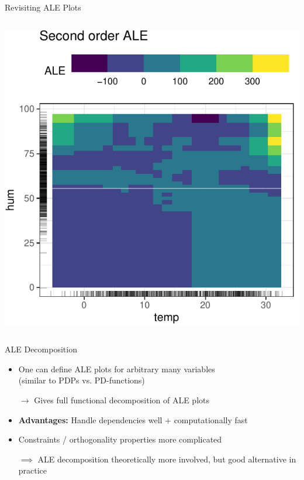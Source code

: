 \documentclass[10pt,compress,t,notes=noshow, xcolor=table]{beamer}
\begin{document}
\begin{frame}{Revisiting ALE Plots}
\begin{columns}[c, totalwidth=\linewidth]
\begin{column}{0.5\textwidth}
        \includegraphics{figure/ale2d}
    \end{column}
    \end{columns}

    
\end{frame}

\begin{frame}{ALE Decomposition}

    \begin{itemize}
        \item One can define ALE plots for arbitrary many variables \\
        (similar to PDPs vs. PD-functions)
        \item[$\rightarrow$] Gives full functional decomposition of ALE plots
        \pause
        \item \textbf{Advantages:} Handle dependencies well + computationally fast
        \item Constraints / orthogonality properties more complicated
        \item[$\implies$] ALE decomposition theoretically more involved, but good alternative in practice
    \end{itemize}
    
\end{frame}
\end{document}
